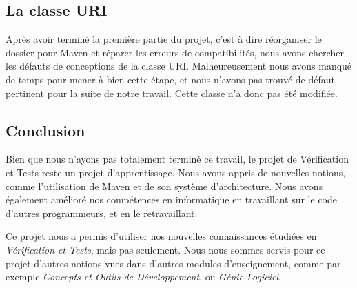 \documentclass[a4paper]{article}
\begin{document}
		\vspace{0.5cm}

		\subsection{La classe URI}

		\vspace{0.5cm}

			Après avoir terminé la première partie du projet, c'est à dire réorganiser le dossier pour Maven et réparer les erreurs de compatibilités, nous avons chercher les défauts de conceptions de la classe URI. Malheureusement nous avons manqué de temps pour mener à bien cette étape, et nous n'avons pas trouvé de défaut pertinent pour la suite de notre travail. Cette classe n'a donc pas été modifiée.

			\newpage

	\begin{center}
		\section{Conclusion}
	\end{center}	
		Bien que nous n'ayons pas totalement terminé ce travail, le projet de Vérification et Tests reste un projet d'apprentissage. Nous avons appris de nouvelles notions, comme l'utilisation de Maven et de son système d'architecture. Nous avons également amélioré nos compétences en informatique en travaillant sur le code d'autres programmeurs, et en le retravaillant.

		\vspace{0.5cm}

		Ce projet nous a permis d'utiliser nos nouvelles connaissances étudiées en \textit{Vérification et Tests}, mais pas seulement. Nous nous sommes servis pour ce projet d'autres notions vues dans d'autres modules d'enseignement, comme par exemple \textit{Concepts et Outils de Développement}, ou \textit{Génie Logiciel}.
 
\end{document}
